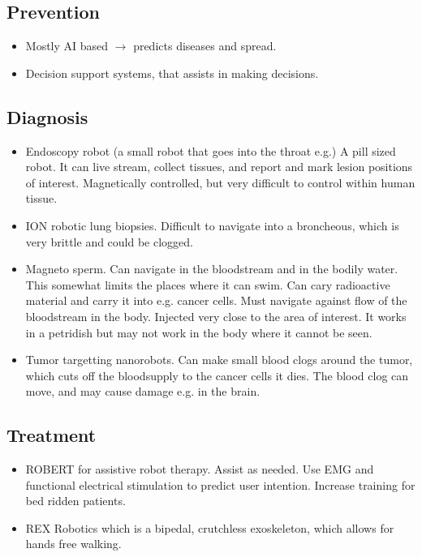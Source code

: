 \documentclass[a4paper]{article}
\begin{document}
\subsection{Prevention}
\begin{itemize}
\item Mostly AI based $ \rightarrow $ predicts diseases and spread.
\item Decision support systems, that assists in making decisions.
\end{itemize}

\subsection{Diagnosis}
\begin{itemize}
	\item Endoscopy robot (a small robot that goes into the throat e.g.) A pill sized robot. It can live stream, collect tissues, and report and mark lesion positions of interest. Magnetically controlled, but very difficult to control within human tissue.
	\item ION robotic lung biopsies. Difficult to navigate into a broncheous, which is very brittle and could be clogged.
	\item Magneto sperm. Can navigate in the bloodstream and in the bodily water. This somewhat limits the places where it can swim. Can cary radioactive material and carry it into e.g. cancer cells. Must navigate against flow of the bloodstream in the body. Injected very close to the area of interest. It works in a petridish but may not work in the body where it cannot be seen.
	\item Tumor targetting nanorobots. Can make small blood clogs around the tumor, which cuts off the bloodsupply to the cancer cells it dies. The blood clog can move, and may cause damage e.g. in the brain. 
\end{itemize}


\subsection{Treatment}
\begin{itemize}
	\item ROBERT for assistive robot therapy. Assist as needed. Use EMG and functional electrical stimulation to predict user intention. Increase training for bed ridden patients. 
	\item REX Robotics which is a bipedal, crutchless exoskeleton, which allows for hands free walking. 
\end{itemize}
\end{document}
